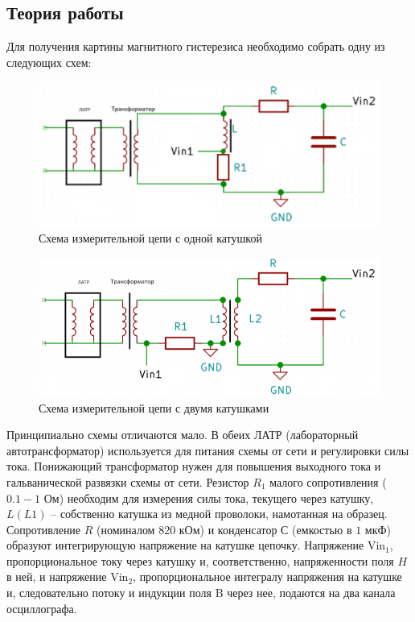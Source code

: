 \documentclass[a4paper,14pt]{extarticle}
\begin{document}
		\subsection{Теория работы}
			Для получения картины магнитного гистерезиса необходимо собрать одну из следующих схем:
			\begin{figure}[h]
				\centering
				\includegraphics[width=0.9\linewidth]{схема2.png}
				\caption{Схема измерительной цепи с одной катушкой}
				\label{fig3}
			\end{figure}
			\newline
			\begin{figure}[h]
				\centering
				\includegraphics[width=0.9\linewidth]{схема3.png}
				\caption{Схема измерительной цепи с двумя катушками}
				\label{fig3}
			\end{figure}
			\newpage
			Принципиально схемы отличаются мало. В обеих ЛАТР (лабораторный автотрансформатор) используется для питания схемы от сети и регулировки силы тока. Понижающий трансформатор нужен для повышения выходного тока и гальванической развязки схемы от сети. Резистор $R_1$ малого сопротивления ($0.1-1$ Ом) необходим для измерения силы тока, текущего через катушку, $L (L1)$ – собственно катушка из медной проволоки, намотанная на образец. Сопротивление $R$ (номиналом $820$ кОм) и конденсатор $С$ (емкостью в $1$ мкФ) образуют интегрирующую напряжение на катушке цепочку. Напряжение ${\text{Vin}}_1$, пропорциональное току через катушку и, соответственно, напряженности поля $H$ в ней, и напряжение ${\text{Vin}}_2$, пропорциональное интегралу напряжения на катушке и, следовательно потоку и индукции поля B через нее, подаются на два канала осциллографа. 
\end{document}
